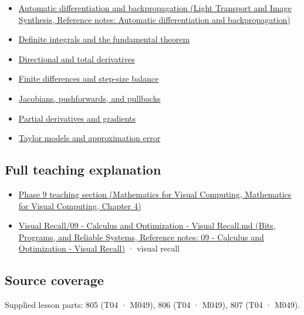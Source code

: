 \begin{itemize}
\tightlist
\item
  \href{../04-Light-Transport-and-Image-Synthesis/main.pdf\#nameddest=appendix-40df0855b4a7}{Automatic differentiation and backpropagation (Light Transport and Image Synthesis, Reference notes: Automatic differentiation and backpropagation)}
\item
  \hyperref[appendix-1a50e72435c2]{Definite integrals and the fundamental theorem}
\item
  \hyperref[appendix-e2d476574aab]{Directional and total derivatives}
\item
  \hyperref[appendix-e2d7b4f2161d]{Finite differences and step-size balance}
\item
  \hyperref[appendix-d8a7ddb675eb]{Jacobians, pushforwards, and pullbacks}
\item
  \hyperref[appendix-677b59746ae0]{Partial derivatives and gradients}
\item
  \hyperref[appendix-32f39e9a3738]{Taylor models and approximation error}
\end{itemize}

\subsection{Full teaching explanation}\label{appendix-7bc181935c42-full-teaching-explanation}

\begin{itemize}
\tightlist
\item
  \href{../02-Mathematics-for-Visual-Computing/main.pdf\#nameddest=01-foundations-i-ch020-functions-limits-continuity-and-scalar-change}{Phase 9 teaching section (Mathematics for Visual Computing, Mathematics for Visual Computing, Chapter 4)}
\item
  \href{../01-Bits-Programs-and-Reliable-Systems/main.pdf\#nameddest=appendix-adf48f5dc5c1}{Visual Recall/09 - Calculus and Optimization - Visual Recall.md (Bits, Programs, and Reliable Systems, Reference notes: 09 - Calculus and Optimization - Visual Recall)} · visual recall
\end{itemize}

\subsection{Source coverage}\label{appendix-7bc181935c42-source-coverage}

Supplied lesson parts: 805 (T04 · M049), 806 (T04 · M049), 807 (T04 · M049).
